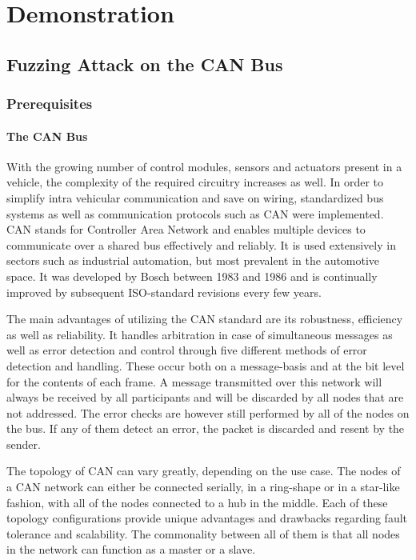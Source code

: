 \chapter{Demonstration}

\section{Fuzzing Attack on the CAN Bus}
\subsection{Prerequisites}
\subsubsection{The CAN Bus}
With the growing number of control modules, sensors and actuators present in a vehicle, the complexity of the required circuitry increases as well. In order to simplify intra vehicular communication and save on wiring, standardized bus systems as well as communication protocols such as CAN were implemented. CAN stands for Controller Area Network and enables multiple devices to communicate over a shared bus effectively and reliably. It is used extensively in sectors such as industrial automation, but most prevalent in the automotive space. It was developed by Bosch between 1983 and 1986 and is continually improved by subsequent ISO-standard revisions every few years.

The main advantages of utilizing the CAN standard are its robustness, efficiency as well as reliability. It handles arbitration in case of simultaneous messages as well as error detection and control through five different methods of error detection and handling. These occur both on a message-basis and at the bit level for the contents of each frame. A message transmitted over this network will always be received by all participants and will be discarded by all nodes that are not addressed. The error checks are however still performed by all of the nodes on the bus. If any  of them detect an error, the packet is discarded and resent by the sender.

The topology of CAN can vary greatly, depending on the use case. The nodes of a CAN network can either be connected serially, in a ring-shape or in a star-like fashion, with all of the nodes connected to a hub in the middle. Each of these topology configurations provide unique advantages and drawbacks regarding fault tolerance and scalability. 
The commonality between all of them is that all nodes in the network can function as a master or a slave.

